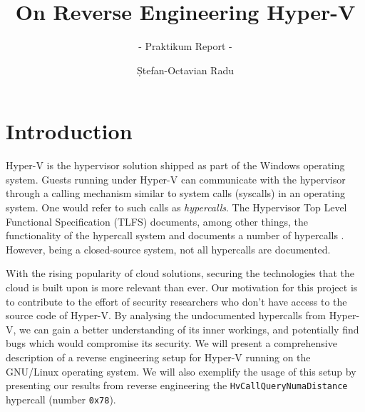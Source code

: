 \documentclass[runningheads]{llncs}
\newcommand{\cc}{\lstinline[mathescape]}
\begin{document}
%
\title{On Reverse Engineering Hyper-V}
\subtitle{- Praktikum Report -}
%
%
\author{Ștefan-Octavian Radu}
%
%
%
\maketitle %
%


\section{Introduction}

Hyper-V is the hypervisor solution shipped as part of the Windows operating
system. Guests running under Hyper-V can communicate with the hypervisor
through a calling mechanism similar to system calls (syscalls) in an operating
system. One would refer to such calls as \emph{hypercalls}. The Hypervisor Top
Level Functional Specification (TLFS) documents, among other things, the
functionality of the hypercall system and documents a number of hypercalls
\cite{tlfs}. However, being a closed-source system, not all hypercalls are
documented.

With the rising popularity of cloud solutions, securing the technologies that
the cloud is built upon is more relevant than ever. Our motivation for this
project is to contribute to the effort of security researchers who don't have
access to the source code of Hyper-V. By analysing the undocumented hypercalls
from Hyper-V, we can gain a better understanding of its inner workings, and
potentially find bugs which would compromise its security. We will present a
comprehensive description of a reverse engineering setup for Hyper-V running on
the GNU/Linux operating system. We will also exemplify the usage of this setup
by presenting our results from reverse engineering the
\cc{HvCallQueryNumaDistance} hypercall (number \cc{0x78}). 
\end{document}
